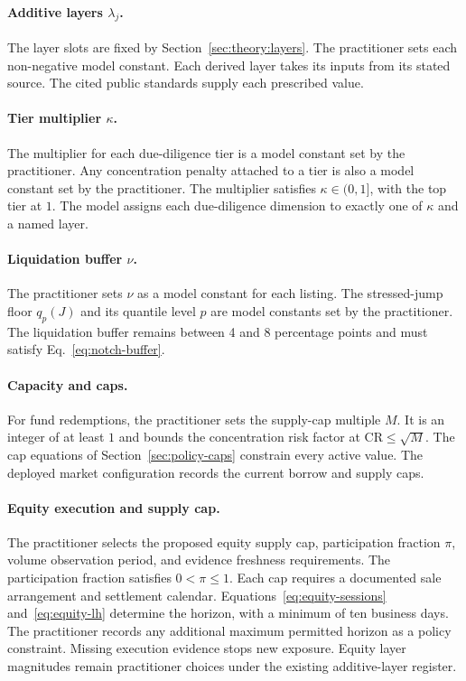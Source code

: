 \paragraph{Additive layers $\lambda_j$.}
The layer slots are fixed by Section~\ref{sec:theory:layers}. The practitioner sets each non-negative model constant. Each derived layer takes its inputs from its stated source. The cited public standards supply each prescribed value.

\paragraph{Tier multiplier $\kappa$.}
The multiplier for each due-diligence tier is a model constant set by the practitioner. Any concentration penalty attached to a tier is also a model constant set by the practitioner. The multiplier satisfies $\kappa \in (0,1]$, with the top tier at $1$. The model assigns each due-diligence dimension to exactly one of $\kappa$ and a named layer.

\paragraph{Liquidation buffer $\nu$.}
The practitioner sets $\nu$ as a model constant for each listing. The stressed-jump floor $q_p(J)$ and its quantile level $p$ are model constants set by the practitioner. The liquidation buffer remains between 4 and 8 percentage points and must satisfy Eq.~\eqref{eq:notch-buffer}.

\paragraph{Capacity and caps.}
For fund redemptions, the practitioner sets the supply-cap multiple $M$. It is an integer of at least $1$ and bounds the concentration risk factor at $\mathrm{CR}\le\sqrt{M}$. The cap equations of Section~\ref{sec:policy-caps} constrain every active value. The deployed market configuration records the current borrow and supply caps.

\paragraph{Equity execution and supply cap.}
The practitioner selects the proposed equity supply cap, participation fraction $\pi$, volume observation period, and evidence freshness requirements. The participation fraction satisfies $0<\pi\le1$. Each cap requires a documented sale arrangement and settlement calendar. Equations~\eqref{eq:equity-sessions} and~\eqref{eq:equity-lh} determine the horizon, with a minimum of ten business days. The practitioner records any additional maximum permitted horizon as a policy constraint. Missing execution evidence stops new exposure. Equity layer magnitudes remain practitioner choices under the existing additive-layer register.

